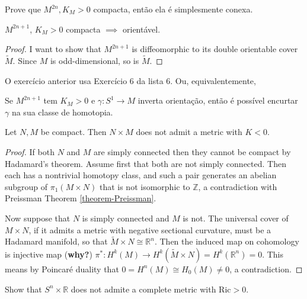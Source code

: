 \begin{exercise}
\label{exercise-even-dimen-posit-k-compa}
Prove que $M^{2n},K_M>0$ compacta, então ela
é simplesmente conexa.
\end{exercise}

\begin{exercise}
\label{exercise-odd-dimen-posit-k-orien}
$M^{2n+1}$, $K_M>0$ compacta $\implies$
orientável.
\end{exercise}

\begin{proof}
I want to show that $M^{2n+1}$ is
diffeomorphic to its double orientable cover
 $\tilde{M}$. Since $M$ is odd-dimensional,
 so is $\tilde{M}$.
\end{proof}

O exercício anterior usa Exercício 6 da lista
6. Ou, equivalentemente,

\begin{exercise}
\label{exercise-inver-orien-short}
Se $M^{2n+1}$ tem $K_M >0$ e $\gamma:S^1 \to
M$ inverta orientação, então é
possível encurtar $\gamma$ na sua classe de
homotopia.
\end{exercise}

\begin{exercise}
\label{exercise-produ-compa-does-not-admit}
Let $N,M$ be compact. Then $N \times M$ does
not admit a metric with $K<0$.
\end{exercise}

\begin{proof}
If both $N$ and $M$ are simply connected then
they cannot be compact by
Hadamard's theorem. Assume first that both
are not simply connected. Then each
has a nontrivial homotopy class, and such a
pair generates an abelian subgroup
of $\pi_1(M \times N)$ that is not isomorphic
to $\mathbb{Z}$, a contradiction
with Preissman Theorem
\ref{theorem-Preissman}.

Now suppose that $N$ is simply connected and
$M$ is not. The universal cover of
$M\times N$, if it admits a metric with
negative sectional curvature,
must be a Hadamard manifold, so that
$\tilde{M} \times N \cong \mathbb{R}^n$.
Then the induced map on cohomology is
injective map ({\bf why?})
$\pi^* :H^{k}(M)\to H^{k}(\tilde{M} \times
N)=H^{k}(\mathbb{R}^n)=0$. This means
by Poincaré duality that $0=H^{n}(M)\cong
H_0(M)\neq 0$, a contradiction.
\end{proof}

\begin{exercise}
\label{exercise-SnxR-no-positive-Ric}
Show that $S^n \times \mathbb{R}$ does not
admite a complete metric with
$\text{Ric}>0$.
\end{exercise}


